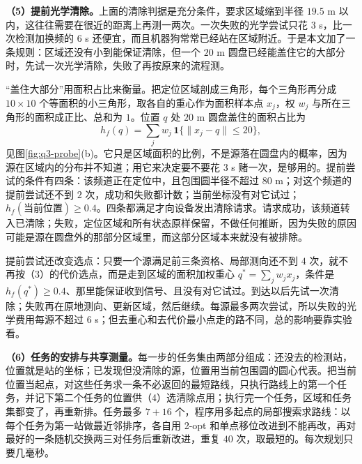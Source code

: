 \textbf{（5）提前光学清除。}上面的清除判据是充分条件，要求区域缩到半径 $19.5$ m 以内，这往往需要在很近的距离上再测一两次。一次失败的光学尝试只花 $3$ s，比一次检测加换频的 $6$ s 还便宜，而且机器狗常常已经站在区域附近。于是本文加了一条规则：区域还没有小到能保证清除，但一个 $20$ m 圆盘已经能盖住它的大部分时，先试一次光学清除，失败了再按原来的流程测。

“盖住大部分”用面积占比来衡量。把定位区域剖成三角形，每个三角形再分成 $10\times10$ 个等面积的小三角形，取各自的重心作为面积样本点 $x_j$，权 $w_j$ 与所在三角形的面积成正比、总和为 $1$。位置 $q$ 处 $20$ m 圆盘盖住的面积占比为
\begin{equation}\label{eq:q3-14}
h_f(q)=\sum_j w_j\,\mathbf 1\{\|x_j-q\|\le20\},
\end{equation}
见图\ref{fig:q3-probe}(b)。它只是区域面积的比例，不是源落在圆盘内的概率，因为源在区域内的分布并不知道；用它来决定要不要花 $3$ s 赌一次，是够用的。提前尝试的条件有四条：该频道正在定位中，且包围圆半径不超过 $80$ m；对这个频道的提前尝试还不到 $2$ 次，成功和失败都计数；当前坐标没有对它试过；$h_f(\text{当前位置})\ge0.4$。四条都满足才向设备发出清除请求。请求成功，该频道转入已清除；失败，定位区域和所有状态原样保留，不做任何推断，因为失败的原因可能是源在圆盘外的那部分区域里，而这部分区域本来就没有被排除。

提前尝试还改变选点：只要一个源满足前三条资格、局部测向还不到 $4$ 次，就不再按（3）的代价选点，而是走到区域的面积加权重心 $q^*=\sum_j w_jx_j$，条件是 $h_f(q^*)\ge0.4$、那里能保证收到信号、且没有对它试过。到达以后先试一次清除；失败再在原地测向、更新区域，然后继续。每源最多两次尝试，所以失败的光学费用每源不超过 $6$ s；但去重心和去代价最小点走的路不同，总的影响要靠实验看。

\begin{center}
\begin{minipage}{\linewidth}
\centering
\QThreeProbeFigure
{}
\label{fig:q3-probe}
\end{minipage}
\end{center}

\textbf{（6）任务的安排与共享测量。}每一步的任务集由两部分组成：还没去的检测站，位置就是站的坐标；已发现但没清除的源，位置用当前包围圆的圆心代表。把当前位置当起点，对这些任务求一条不必返回的最短路线，只执行路线上的第一个任务，并记下第二个任务的位置供（4）选清除点用；执行完一个任务，区域和任务集都变了，再重新排。任务最多 $7+16$ 个，程序用多起点的局部搜索求路线：以每个任务为第一站做最近邻排序，各自用 2-opt 和单点移位改进到不能再改，再对最好的一条随机交换两三对任务后重新改进，重复 $40$ 次，取最短的。每次规划只要几毫秒。

